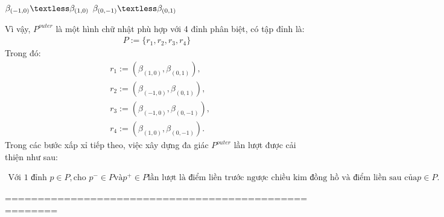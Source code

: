\documentclass[12pt,a4paper,openany,oneside]{report}
\begin{document}
\begin{center}
	$\beta_{(-1, 0)} \textless \beta_{(1, 0)}$  $\beta_{(0, -1)} \textless \beta_{(0, 1)}$
\end{center}
Vì vậy, ${P}^{outer}$ là một hình chữ nhật phù hợp với 4 đỉnh phân biệt, có tập đỉnh là:
\begin{align}\label{ct2.9}
	P := \{r_1, r_2, r_3, r_4\}
\end{align}
Trong đó:
\begin{equation}\label{ct2.10}
	\begin{aligned}
		& r_1:=\left(\beta_{(1,0)}, \beta_{(0,1)}\right), \\
		& r_2:=\left(\beta_{(-1,0)}, \beta_{(0,1)}\right), \\
		& r_3:=\left(\beta_{(-1,0)}, \beta_{(0,-1)}\right), \\
		& r_4:=\left(\beta_{(1,0)}, \beta_{(0,-1)}\right) .
	\end{aligned}
\end{equation}
Trong các bước xấp xỉ tiếp theo, việc xây dựng đa giác ${P}^{outer}$ lần lượt được cải thiện như sau:

\begin{align} \label{ct2.11}
\text{Với 1 đỉnh }p \in P, \text{cho } p^{-} \in P \text{và} p^{+} \in P \text{lần lượt là điểm liền trước ngược chiều kim đồng hồ và điểm liền sau của} p \in P.
\end{align}















======================================================
\end{document}
